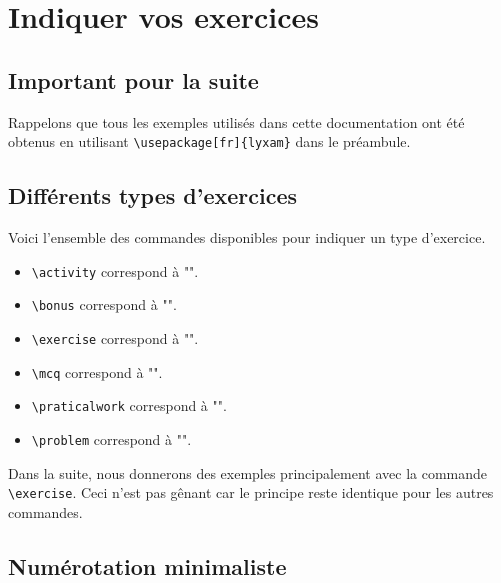 \documentclass[12pt,a4paper]{scrartcl}
\theoremstyle{definition}
\begin{document}
\section{Indiquer vos exercices}

    \subsection{Important pour la suite}


Rappelons que tous les exemples utilisés dans cette documentation ont été obtenus en utilisant \verb+\usepackage[fr]{lyxam}+ dans le préambule.


    \subsection{Différents types d'exercices}

Voici l'ensemble des commandes disponibles pour indiquer un type d'exercice.

\begin{itemize}[label=\textbullet]
\makeatletter
    \item \verb+\activity+ correspond à "\lyxam@text@activity{}".
    
    \item \verb+\bonus+ correspond à "\lyxam@text@bonus{}".
    
    \item \verb+\exercise+ correspond à "\lyxam@text@exercise{}".
    
    \item \verb+\mcq+ correspond à "\lyxam@text@mcq{}".
    
    \item \verb+\praticalwork+ correspond à "\lyxam@text@praticalwork{}".
    
    \item \verb+\problem+ correspond à "\lyxam@text@problem{}".
\makeatother
\end{itemize}

Dans la suite, nous donnerons des exemples principalement avec la commande \verb+\exercise+. Ceci n'est pas gênant car le principe reste identique pour les autres commandes.


    \subsection{Numérotation minimaliste}
\end{document}
